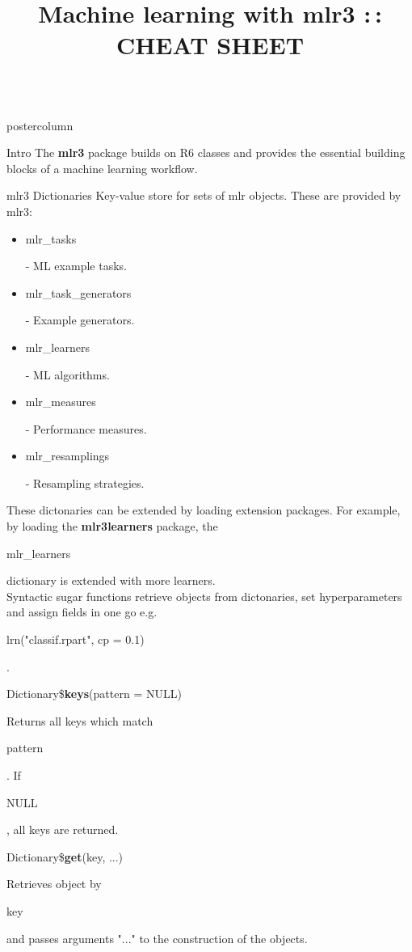 \documentclass{beamer}
\title{Machine learning with mlr3 :\,: CHEAT SHEET} %
\newlength{\columnheight} %
\newcommand{\codeinline}[1]{\begin{codeboxinline}#1\end{codeboxinline}}
\begin{document}
\begin{frame}[fragile]{}
	\begin{columns}
		\begin{column}{.245\textwidth}
			\begin{beamercolorbox}[center]{postercolumn}
				\begin{minipage}{.98\textwidth}
					\parbox[t][\columnheight]{\textwidth}{
						\begin{myblock}{Intro}
							The \textbf{mlr3} package builds on R6 classes and provides the essential building
							blocks of a machine learning workflow.
						\end{myblock}
						\begin{myblock}{mlr3 Dictionaries}
							Key-value store for sets of mlr objects. These are provided by mlr3:
							\begin{itemize}
								\item \codeinline{mlr\_tasks} - ML example tasks.
								\item \codeinline{mlr\_task\_generators} - Example generators.
								\item \codeinline{mlr\_learners} - ML algorithms.
								\item \codeinline{mlr\_measures} - Performance measures.
								\item \codeinline{mlr\_resamplings} - Resampling strategies.
							\end{itemize}
							\vspace{0.5em}
							These dictonaries can be extended by loading extension packages.
							For example, by loading the \textbf{mlr3learners} package, the \codeinline {mlr\_learners} dictionary is extended with more learners.
							\vspace{1em}
							\\
							Syntactic sugar functions retrieve objects from dictonaries, set hyperparameters and assign fields in one go e.g. \codeinline{lrn("classif.rpart", cp = 0.1)}.
							\\
							\begin{codebox}
								Dictionary\$\textbf{keys}(pattern = NULL)
							\end{codebox}
							Returns all keys which match \codeinline{pattern}.
							If \codeinline{NULL}, all keys are returned.
							\\
							\begin{codebox}
								Dictionary\$\textbf{get}(key, ...)
							\end{codebox}
							Retrieves object by \codeinline{key} and passes arguments "..." to the construction of the objects.

\end{myblock}}
\end{minipage}
\end{beamercolorbox}
\end{column}
\end{columns}
\end{frame}
\end{document}
